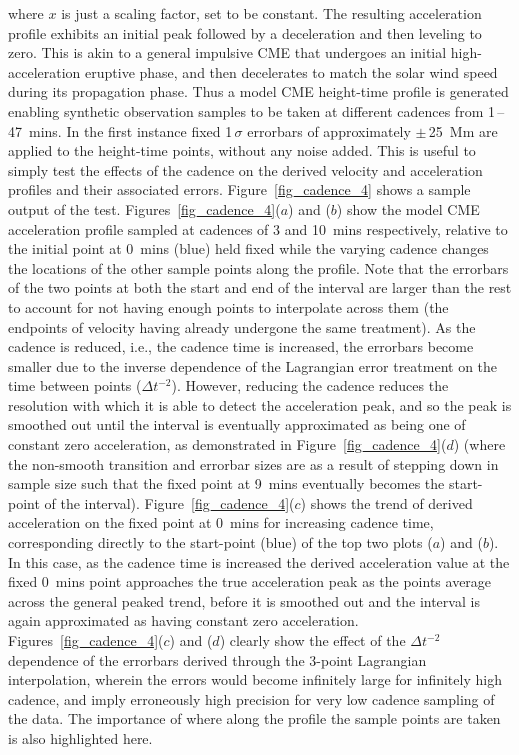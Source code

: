 \documentclass[structabstract]{aa}
\begin{document}
where $x$ is just a scaling factor, set to be constant. The resulting acceleration profile exhibits an initial peak followed by a deceleration and then leveling to zero. This is akin to a general impulsive CME that undergoes an initial high-acceleration eruptive phase, and then decelerates to match the solar wind speed during its propagation phase. Thus a model CME height-time profile is generated enabling synthetic observation samples to be taken at different cadences from 1\,--\,47~mins. In the first instance fixed 1\,$\sigma$ errorbars of approximately $\pm$\,25~Mm are applied to the height-time points, without any noise added. This is useful to simply test the effects of the cadence on the derived velocity and acceleration profiles and their associated errors. Figure~\ref{fig_cadence_4} shows a sample output of the test. Figures~\ref{fig_cadence_4}($a$) and ($b$) show the model CME acceleration profile sampled at cadences of 3 and 10~mins respectively, relative to the initial point at 0~mins (blue) held fixed while the varying cadence changes the locations of the other sample points along the profile. Note that the errorbars of the two points at both the start and end of the interval are larger than the rest to account for not having enough points to interpolate across them (the endpoints of velocity having already undergone the same treatment). As the cadence is reduced, i.e., the cadence time is increased, the errorbars become smaller due to the inverse dependence of the Lagrangian error treatment on the time between points ($\Delta t^{-2}$). However, reducing the cadence reduces the resolution with which it is able to detect the acceleration peak, and so the peak is smoothed out until the interval is eventually approximated as being one of constant zero acceleration, as demonstrated in Figure~\ref{fig_cadence_4}($d$) (where the non-smooth transition and errorbar sizes are as a result of stepping down in sample size such that the fixed point at 9~mins eventually becomes the start-point of the interval). Figure~\ref{fig_cadence_4}($c$) shows the trend of derived acceleration on the fixed point at 0~mins for increasing cadence time, corresponding directly to the start-point (blue) of the top two plots ($a$) and ($b$). In this case, as the cadence time is increased the derived acceleration value at the fixed 0~mins point approaches the true acceleration peak as the points average across the general peaked trend, before it is smoothed out and the interval is again approximated as having constant zero acceleration. Figures~\ref{fig_cadence_4}($c$) and ($d$) clearly show the effect of the $\Delta t^{-2}$ dependence of the errorbars derived through the 3-point Lagrangian interpolation, wherein the errors would become infinitely large for infinitely high cadence, and imply erroneously high precision for very low cadence sampling of the data. The importance of where along the profile the sample points are taken is also highlighted here.
\end{document}
